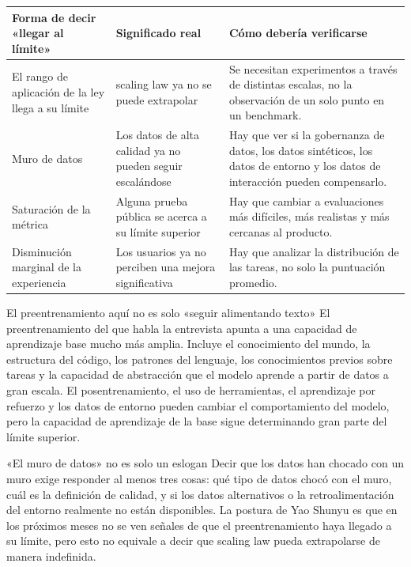 \documentclass[a4paper]{article}
\begin{document}
\noindent\begin{tabularx}{\textwidth}{p{}p{}X}
\toprule
Forma de decir «llegar al límite» & Significado real & Cómo debería verificarse \\
\midrule
El rango de aplicación de la ley llega a su límite & scaling law ya no se puede extrapolar & Se necesitan experimentos a través de distintas escalas, no la observación de un solo punto en un benchmark. \\
Muro de datos & Los datos de alta calidad ya no pueden seguir escalándose & Hay que ver si la gobernanza de datos, los datos sintéticos, los datos de entorno y los datos de interacción pueden compensarlo. \\
Saturación de la métrica & Alguna prueba pública se acerca a su límite superior & Hay que cambiar a evaluaciones más difíciles, más realistas y más cercanas al producto. \\
Disminución marginal de la experiencia & Los usuarios ya no perciben una mejora significativa & Hay que analizar la distribución de las tareas, no solo la puntuación promedio. \\
\bottomrule
\end{tabularx}

\begin{knowledgebox}{El preentrenamiento aquí no es solo «seguir alimentando texto»}
El preentrenamiento del que habla la entrevista apunta a una capacidad de aprendizaje base mucho más amplia. Incluye el conocimiento del mundo, la estructura del código, los patrones del lenguaje, los conocimientos previos sobre tareas y la capacidad de abstracción que el modelo aprende a partir de datos a gran escala. El posentrenamiento, el uso de herramientas, el aprendizaje por refuerzo y los datos de entorno pueden cambiar el comportamiento del modelo, pero la capacidad de aprendizaje de la base sigue determinando gran parte del límite superior.
\end{knowledgebox}

\begin{warningbox}{«El muro de datos» no es solo un eslogan}
Decir que los datos han chocado con un muro exige responder al menos tres cosas: qué tipo de datos chocó con el muro, cuál es la definición de calidad, y si los datos alternativos o la retroalimentación del entorno realmente no están disponibles. La postura de Yao Shunyu es que en los próximos meses no se ven señales de que el preentrenamiento haya llegado a su límite, pero esto no equivale a decir que scaling law pueda extrapolarse de manera indefinida.
\end{warningbox}
\end{document}
